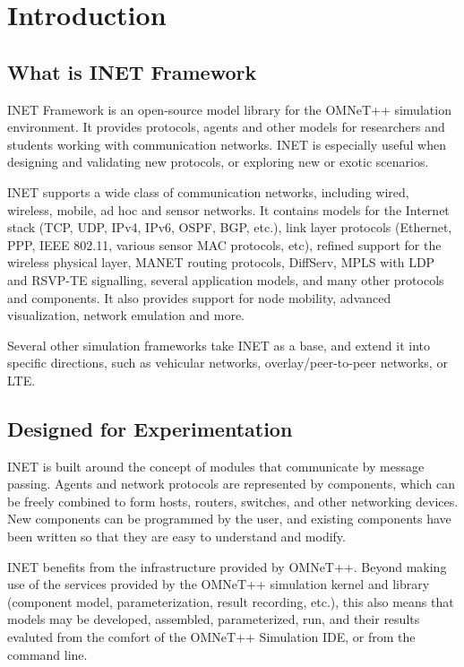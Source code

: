 \chapter{Introduction}
\label{cha:introduction}


\section{What is INET Framework}
\label{sec:introduction:what-is-inet-framework}

INET Framework is an open-source model library for the OMNeT++ simulation
environment. It provides protocols, agents and other models for researchers
and students working with communication networks. INET is especially useful
when designing and validating new protocols, or exploring new or exotic scenarios.

INET supports a wide class of communication networks, including wired,
wireless, mobile, ad hoc and sensor networks.  It contains models for
the Internet stack (TCP, UDP, IPv4, IPv6, OSPF, BGP, etc.), link layer protocols
(Ethernet, PPP, IEEE 802.11, various sensor MAC protocols, etc),
refined support for the wireless physical layer, MANET routing protocols,
DiffServ, MPLS with LDP and RSVP-TE signalling, several application models,
and many other protocols and components. It also provides support for
node mobility, advanced visualization, network emulation and more.

Several other simulation frameworks take INET as a base, and extend it
into specific directions, such as vehicular networks, overlay/peer-to-peer
networks, or LTE.

\section{Designed for Experimentation}
\label{sec:introduction:designed-for-experimentation}

INET is built around the concept of modules that communicate by message passing.
Agents and network protocols are represented by components, which can be freely
combined to form hosts, routers, switches, and other networking devices.
New components can be programmed by the user, and existing components have
been written so that they are easy to understand and modify.

INET benefits from the infrastructure provided by OMNeT++. Beyond making
use of the services provided by the OMNeT++ simulation kernel and library
(component model, parameterization, result recording, etc.), this also means
that models may be developed, assembled, parameterized, run, and their
results evaluted from the comfort of the OMNeT++ Simulation IDE, or
from the command line.


